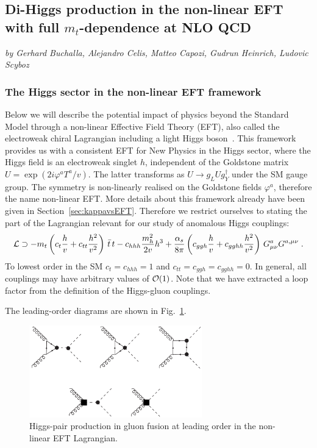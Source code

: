 \subsection{Di-Higgs production in the non-linear EFT with full $m_t$-dependence at NLO QCD}

\begin{center}
\textit{by Gerhard Buchalla, Alejandro Celis, Matteo Capozi, Gudrun Heinrich, Ludovic Scyboz}
\end{center}


\subsubsection{The Higgs sector in the non-linear EFT framework}
\label{sec:EWChL.double.h}

Below we will describe  the potential impact of physics
beyond the Standard Model through a non-linear Effective Field Theory (EFT),
also called the electroweak chiral Lagrangian
including a light Higgs 
boson~\cite{Buchalla:2013rka,Buchalla:2013eza,Buchalla:2017jlu}.
This framework provides us with a consistent EFT
for New Physics in the Higgs sector, where the Higgs field is an electroweak singlet $h$,
independent of the Goldstone matrix $U = \exp(2i\varphi^a T^a/v)$.
The latter transforms as $U\to g_L U g^\dagger_Y$ under the SM gauge group.
The symmetry is non-linearly realised on the Goldstone fields
$\varphi^a$, therefore the name non-linear EFT.
More details about this framework already have been given in
Section~\ref{sec:kappavsEFT}.
Therefore we restrict ourselves to stating the part of the Lagrangian
relevant for our study of anomalous Higgs couplings:
\begin{align}
{\cal L}\supset 
-m_t\left(c_t\frac{h}{v}+c_{tt}\frac{h^2}{v^2}\right)\,\bar{t}\,t -
c_{hhh} \frac{m_h^2}{2v} h^3+\frac{\alpha_s}{8\pi} \left( c_{ggh} \frac{h}{v}+
c_{gghh}\frac{h^2}{v^2}  \right)\, G^a_{\mu \nu} G^{a,\mu \nu}\;.
\label{eq:ewchl}
\end{align}
To lowest order in the SM $c_t=c_{hhh}=1$ and $c_{tt}=c_{ggh}=c_{gghh}=0$.
In general, all couplings may have arbitrary values of ${\cal O}(1)$.
Note that we have extracted a loop factor from the definition of the
Higgs-gluon couplings.  


The leading-order diagrams are shown in Fig.~\ref{fig:hprocess}.
\begin{figure}[htb]
\begin{center}
\includegraphics[width=7.5cm]{section3/plots/hprocess.pdf}
\end{center}
\caption{Higgs-pair production in gluon fusion at leading order
in the non-linear EFT Lagrangian.}
\label{fig:hprocess}
\end{figure}

